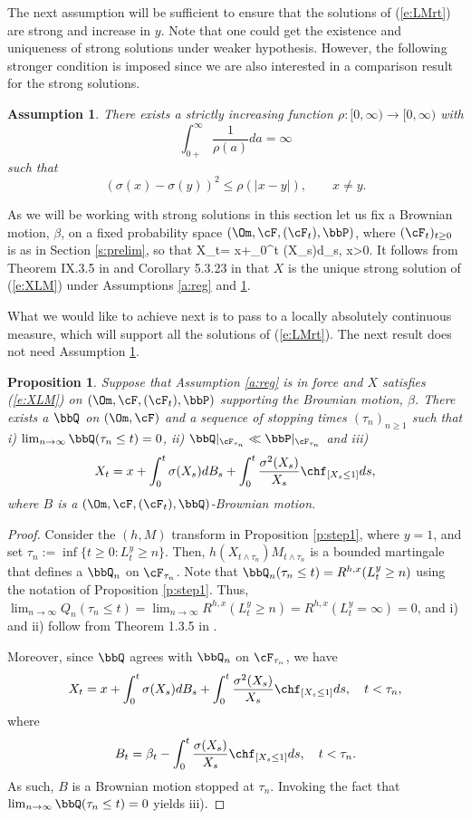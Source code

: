\documentclass[11pt,reqno]{amsart}
\numberwithin{equation}{section}
\newtheorem{proposition}{Proposition}[section]
\newtheorem{assumption}{Assumption}[section]
\def\rar{\rightarrow}
\begin{document}
The next assumption will be sufficient to ensure that the solutions of (\ref{e:LMrt}) are strong and increase in $y$. Note that  one could get the existence and uniqueness of strong solutions under weaker hypothesis. However, the following stronger condition is imposed  since we are also interested in a comparison result for the strong solutions.
\begin{assumption}\label{a:sholder} There exists a strictly increasing function $\rho:[0,\infty)\to [0,\infty)$ with 
\[
\int_{0+}^{\infty}\frac{1}{\rho(a)}da=\infty
\]
such that
\[
(\sigma(x)-\sigma(y))^2 \leq \rho(|x-y|), \qquad x\neq y.
\]
\end{assumption} 
As we will be working with strong solutions in this section let us fix a Brownian motion, $\beta$, on a fixed probability space $(\Om, \cF, (\cF_t), \bbP)$, where $(\cF_t)_{t \geq 0}$ is as in Section \ref{s:prelim}, so that  
\be \label{e:XLM}
X_t= x+\int_0^t \sigma(X_s)d\beta_s, \quad x>0.
\ee
It follows from  Theorem IX.3.5 in \cite{RY} and Corollary 5.3.23 in \cite{KS} that $X$ is the unique strong solution of  (\ref{e:XLM}) under Assumptions \ref{a:reg} and \ref{a:sholder}.

What we would like to achieve next is to pass to a locally absolutely continuous measure, which will support all the solutions of (\ref{e:LMrt}). The next result does not need Assumption \ref{a:sholder}.
\begin{proposition} \label{p:labcQ} Suppose that Assumption \ref{a:reg} is in force and $X$ satisfies (\ref{e:XLM}) on $(\Om, \cF, (\cF_t), \bbP)$ supporting the Brownian motion, $\beta$. There exists a $\bbQ$ on $(\Om, \cF)$  and a sequence of stopping times $(\tau_n)_{n \geq 1}$ such that i) $\lim_{n \rar \infty}\bbQ(\tau_n\leq t)=0$, ii) $\bbQ |_{\cF_{\tau_n}} \ll \bbP |_{\cF_{\tau_n}}$ and iii)
\[
X_t= x+\int_0^t \sigma(X_s)dB_s +\int_0^t\frac{\sigma^2(X_s)}{X_s}\chf_{[X_s\leq 1]}ds,
\]
where $B$ is a $(\Om, \cF, (\cF_t), \bbQ)$-Brownian motion.
\end{proposition}
\begin{proof}
Consider the $(h,M)$ transform in Proposition \ref{p:step1}, where $y=1$, and set $\tau_n:=\inf\{t\geq 0:L^y_t \geq n\}$.  Then,
$h(X_{t \wedge \tau_n}) M_{t \wedge \tau_n}$ is a bounded martingale that defines a $\bbQ_n$ on $\cF_{\tau_n}$. Note that $\bbQ_n(\tau_n \leq t)= R^{h,x}(L^y_t \geq n)$ using the notation of Proposition \ref{p:step1}. Thus, $\lim_{n \rar \infty}Q_n(\tau_n \leq t)=\lim_{n \rar \infty}R^{h,x}(L^y_t \geq n)=R^{h,x}(L^y_t= \infty)=0$, and i) and ii) follow from Theorem 1.3.5 in \cite{SV}. 

Moreover, since $\bbQ$ agrees with $\bbQ_n$ on $\cF_{\tau_n}$, we have
\[
X_t= x+\int_0^t \sigma(X_s)dB_s +\int_0^t\frac{\sigma^2(X_s)}{X_s}\chf_{[X_s\leq 1]}ds, \quad t<\tau_n,
\]
where 
\[
B_t= \beta_t-\int_0^t \frac{\sigma(X_s)}{X_s}\chf_{[X_s\leq 1]}ds, \quad t <\tau_n.
\]
As such, $B$ is a Brownian motion stopped at $\tau_n$. Invoking the fact that $\lim_{n \rar \infty} \bbQ(\tau_n \leq t)=0$ yields iii).
\end{proof}
\end{document}
